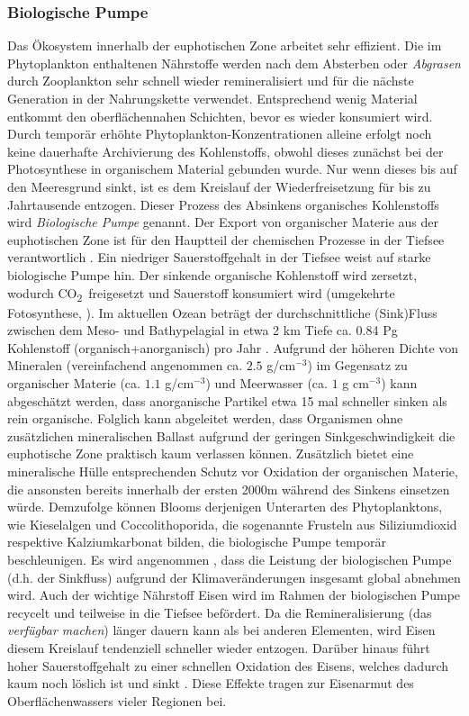 \documentclass[12pt,a4paper,onecolumn]{scrartcl}
\newcommand{\cotwo}{CO\textsubscript{2}}
\begin{document}
\subsubsection{Biologische Pumpe} \label{sec:biopump}
Das Ökosystem innerhalb der euphotischen Zone arbeitet sehr effizient. Die im Phytoplankton enthaltenen Nährstoffe werden nach dem Absterben oder \textit{Abgrasen} durch Zooplankton sehr schnell wieder remineralisiert und für die nächste Generation in der Nahrungskette verwendet. Entsprechend wenig Material entkommt den oberflächennahen Schichten, bevor es wieder konsumiert wird. Durch temporär erhöhte Phytoplankton-Konzentrationen alleine erfolgt noch keine dauerhafte Archivierung des Kohlenstoffs, obwohl dieses zunächst bei der Photosynthese in organischem Material gebunden wurde. Nur wenn dieses bis auf den Meeresgrund sinkt, ist es dem Kreislauf der Wiederfreisetzung für bis zu Jahrtausende entzogen. Dieser Prozess des Absinkens organisches Kohlenstoffs wird \textit{Biologische Pumpe} genannt. Der Export von organischer Materie aus der euphotischen Zone ist für den Hauptteil der chemischen Prozesse in der Tiefsee verantwortlich \citep{Emerson.2009}. Ein niedriger Sauerstoffgehalt in der Tiefsee weist auf starke biologische Pumpe hin. Der sinkende organische Kohlenstoff wird zersetzt, wodurch \cotwo \ freigesetzt und Sauerstoff konsumiert wird (umgekehrte Fotosynthese, \cite{Honjo.2008}). Im aktuellen Ozean beträgt der durchschnittliche (Sink)Fluss zwischen dem Meso- und Bathypelagial in etwa 2 km Tiefe ca. 0.84 Pg Kohlenstoff (organisch+anorganisch) pro Jahr \citep{Honjo.2008}. Aufgrund der höheren Dichte von Mineralen (vereinfachend angenommen ca. $2.5$ g/cm$^{-3}$) im Gegensatz zu organischer Materie (ca. $1.1$ g/cm$^{-3}$) und Meerwasser (ca. $1$ g cm$^{-3}$) kann abgeschätzt werden, dass anorganische Partikel etwa 15 mal schneller sinken als rein organische. Folglich kann abgeleitet werden, dass Organismen ohne zusätzlichen mineralischen Ballast aufgrund der geringen Sinkgeschwindigkeit die euphotische Zone praktisch kaum verlassen können. Zusätzlich bietet eine mineralische Hülle entsprechenden Schutz vor Oxidation der organischen Materie, die ansonsten bereits innerhalb der ersten 2000m während des Sinkens einsetzen würde\citep{Emerson.2009}. Demzufolge können Blooms derjenigen Unterarten des Phytoplanktons, wie Kieselalgen und Coccolithoporida, die sogenannte Frusteln aus Siliziumdioxid respektive Kalziumkarbonat bilden, die biologische Pumpe temporär beschleunigen. Es wird angenommen , dass die Leistung der biologischen Pumpe (d.h. der Sinkfluss) aufgrund der Klimaveränderungen insgesamt global abnehmen wird. Auch der wichtige Nährstoff Eisen wird im Rahmen der biologischen Pumpe recycelt und teilweise in die Tiefsee befördert. Da die Remineralisierung (das \textit{verfügbar machen}) länger dauern kann als bei anderen Elementen, wird Eisen diesem Kreislauf tendenziell schneller wieder entzogen. Darüber hinaus führt hoher Sauerstoffgehalt zu einer schnellen Oxidation des Eisens, welches dadurch kaum noch löslich ist und sinkt \citep{Falkowski.1998}. Diese  Effekte tragen zur Eisenarmut des Oberflächenwassers vieler Regionen bei.
\end{document}
